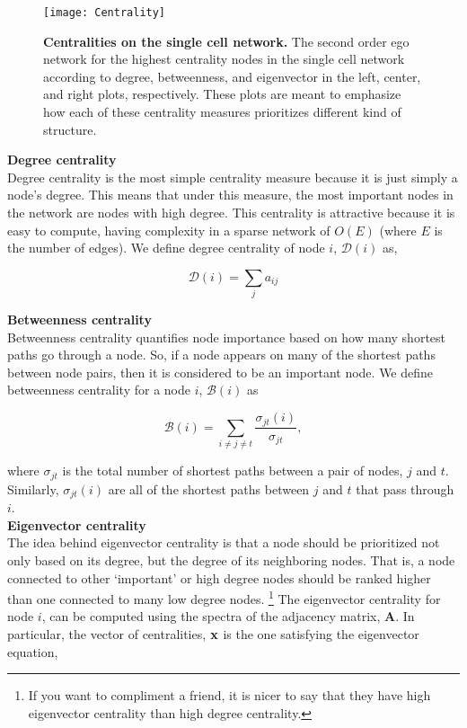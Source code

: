  \begin{figure}[h!]
\begin{center}
\texttt{[image: Centrality]}
\caption{{\bf Centralities on the single cell network.} The second order ego network for the highest centrality nodes in the single cell network according to degree, betweenness, and eigenvector in the left, center, and right plots, respectively. These plots are meant to emphasize how each of these centrality measures prioritizes different kind of structure.}
\label{fig:Centrality}
\end{center}
\end{figure}

{\bf Degree centrality}\\
Degree centrality is the most simple centrality measure because it is just simply a node's degree. This means that under this measure, the most important nodes in the network are nodes with high degree. This centrality is attractive because it is easy to compute, having complexity in a sparse network of $O(E)$ (where $E$ is the number of edges). We define degree centrality of node $i$, $\mathcal{D}(i)$ as,

\begin{equation}
\mathcal{D}(i)=\sum_{j}a_{ij}
\end{equation}

{\bf Betweenness centrality}\\
Betweenness centrality quantifies node importance based on how many shortest paths go through a node. So, if a node appears on many of the shortest paths between node pairs, then it is considered to be an important node. We define betweenness centrality for a node $i$, $\mathcal{B}(i)$ as

\begin{equation}
\mathcal{B}(i)=\sum_{i\ne j\ne t} \frac{\sigma_{jt}(i)}{\sigma_{jt}},
\end{equation}

where $\sigma_{jt}$ is the total number of shortest paths between a pair of nodes, $j$ and $t$. Similarly, $\sigma_{jt}(i)$ are all of the shortest paths between $j$ and $t$ that pass through $i$. \\

{\bf Eigenvector centrality}\\
The idea behind eigenvector centrality is that a node should be prioritized not only based on its degree, but the degree of its neighboring nodes. That is, a node connected to other `important' or high degree nodes should be ranked higher than one connected to many low degree nodes. \footnote{If you want to compliment a friend, it is nicer to say that they have high eigenvector centrality than high degree centrality.} The eigenvector centrality for node $i$, can be computed using the spectra of the adjacency matrix, ${\boldsymbol A}$. In particular, the vector of centralities, ${\bf x}$ is the one satisfying the eigenvector equation,

